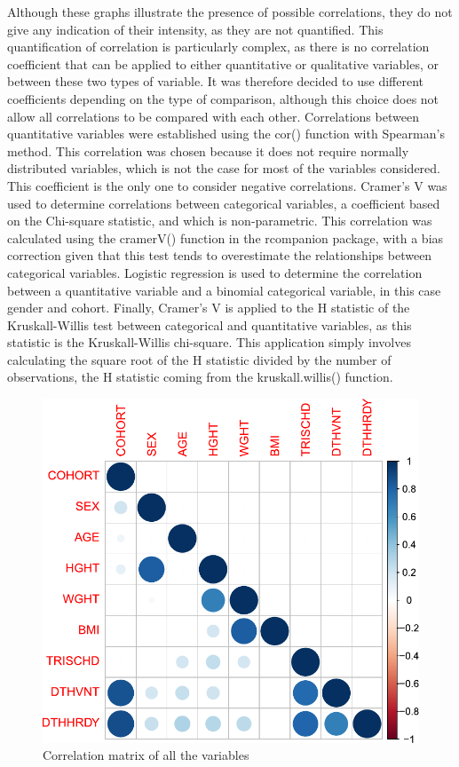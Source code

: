 \documentclass[a4paper, 11pt]{article}
\begin{document}
\begin{multicols}{2}
Although these graphs illustrate the presence of possible correlations, they do not give any indication of their intensity, as they are not quantified. 
This quantification of correlation is particularly complex, as there is no correlation coefficient that can be applied to either quantitative or qualitative variables, or between these two types of variable. 
It was therefore decided to use different coefficients depending on the type of comparison, although this choice does not allow all correlations to be compared with each other. 
Correlations between quantitative variables were established using the cor() function with Spearman's method. 
This correlation was chosen because it does not require normally distributed variables, which is not the case for most of the variables considered. 
This coefficient is the only one to consider negative correlations.
Cramer's V was used to determine correlations between categorical variables, a coefficient based on the Chi-square statistic, and which is non-parametric. 
This correlation was calculated using the cramerV() function in the rcompanion package, with a bias correction given that this test tends to overestimate the relationships between categorical variables.
Logistic regression is used to determine the correlation between a quantitative variable and a binomial categorical variable, in this case gender and cohort. 
Finally, Cramer's V is applied to the H statistic of the Kruskall-Willis test between categorical and quantitative variables, as this statistic is the Kruskall-Willis chi-square. This application simply involves calculating the square root of the H statistic divided by the number of observations, the H statistic coming from the kruskall.willis() function.

\begin{figure}[H]
	\centering
	\includegraphics[width=\columnwidth]{figures/clinical_correlation_plots/corrected_allCorrelations2}
	\caption{Correlation matrix of all the variables}
	\label{fig:allCor}
\end{figure}


\end{multicols}
\end{document}

